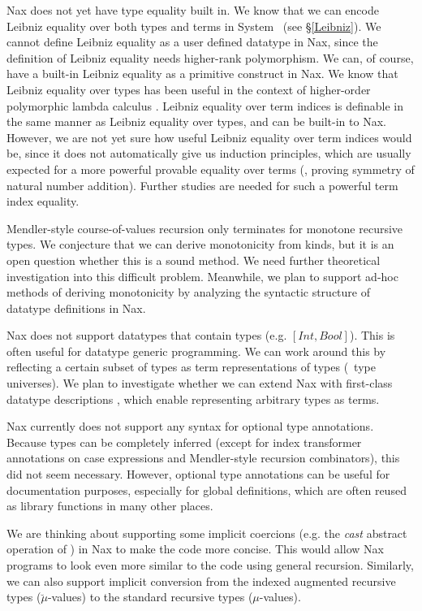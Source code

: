 Nax does not yet have type equality built in. We know that we can encode
Leibniz equality over both types and terms in System \Fi\ (see \S\ref{Leibniz}).
We cannot define Leibniz equality as a user defined datatype in Nax, since
the definition of Leibniz equality needs higher-rank polymorphism. We can,
of course, have a built-in Leibniz equality as a primitive construct in Nax.
We know that Leibniz equality over types has been useful in the context of
higher-order polymorphic lambda calculus \cite{vytiniotis2010parametricity}.
Leibniz equality over term indices is definable in the same manner
as Leibniz equality over types, and can be built-in to Nax. However,
we are not yet sure how useful Leibniz equality over term indices would be,
since it does not automatically give us induction principles, which are
usually expected for a more powerful provable equality over terms (\eg,
proving symmetry of natural number addition). Further studies are needed
for such a powerful term index equality.

Mendler-style course-of-values recursion only terminates
for monotone recursive types.
We conjecture that we can derive monotonicity from kinds,
but it is an open question whether this is a sound method. We need further
theoretical investigation into this difficult problem.
Meanwhile, we plan to support ad-hoc methods of deriving monotonicity
by analyzing the syntactic structure of datatype definitions in Nax.

Nax does not support datatypes that contain types (e.g. $[Int,Bool]$).
This is often useful for datatype generic programming. We can work around
this by reflecting a certain subset of types as term representations of types
(\aka\ type universes). We plan to investigate whether we can extend Nax with
first-class datatype descriptions \cite{DagMcb12}, which enable representing
arbitrary types as terms.

Nax currently does not support any syntax for optional type annotations.
Because types can be completely inferred (except for index transformer
annotations on case expressions and Mendler-style recursion combinators),
this did not seem necessary. However, optional type annotations can be useful
for documentation purposes, especially for global definitions, which are often
reused as library functions in many other places.

We are thinking about supporting some implicit coercions (e.g. the \textit{cast}
abstract operation of \MPr) in Nax to make the code more concise.
This would allow Nax programs to look even more similar to the code
using general recursion. Similarly, we can also support implicit conversion
from the indexed augmented recursive types ($\breve{\mu}$-values) to
the standard recursive types ($\mu$-values).

